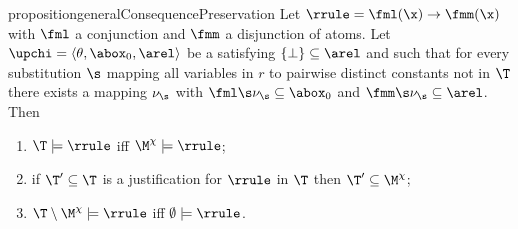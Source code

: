 \begin{restatable}{proposition}{generalConsequencePreservation}
\label{prop:generalConsequencePreservation}
Let $\rrule=\fml(\x)\to\fmm(\x)$ with $\fml$ a conjunction and $\fmm$ a disjunction
of atoms. Let $\upchi = \langle \theta, \abox_0, \arel\rangle$ be  a \bla{} satisfying
$\{\bot\} \subseteq \arel$ and such that for every substitution $\s$ mapping all variables in 
$r$ to pairwise distinct constants not in $\T$ there exists a mapping $\nu_{\s}$ with 
$\fml\s\nu_{\s}\subseteq\abox_0$ and $\fmm\s\nu_{\s}\subseteq\arel$. 
Then
\begin{enumerate}
\item $\T\models \rrule$ iff $\M^{\chi}\models \rrule$;

\item if $\T'\subseteq \T$ is a justification for $\rrule$ in $\T$ then $\T'\subseteq\M^{\chi}$;

\item $\T\setminus \M^{\chi}\models \rrule$ iff $\emptyset\models \rrule$.
\end{enumerate}
\end{restatable}
